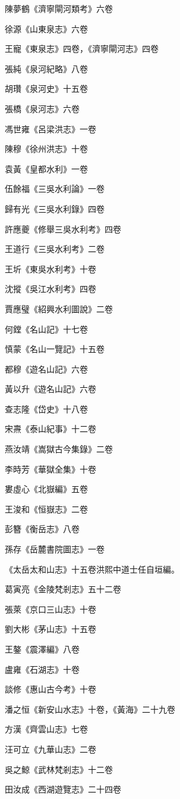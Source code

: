 陳夢鶴《濟寧閘河類考》六卷

徐源《山東泉志》六卷

王寵《東泉志》四卷，《濟寧閘河志》四卷

張純《泉河紀略》八卷

胡瓚《泉河史》十五卷

張橋《泉河志》六卷

馮世雍《呂梁洪志》一卷

陳穆《徐州洪志》十卷

袁黃《皇都水利》一卷

伍餘福《三吳水利論》一卷

歸有光《三吳水利錄》四卷

許應夔《修舉三吳水利考》四卷

王道行《三吳水利考》二卷

王圻《東吳水利考》十卷

沈摐《吳江水利考》四卷

賈應璧《紹興水利圖說》二卷

何鏜《名山記》十七卷

慎蒙《名山一覽記》十五卷

都穆《遊名山記》六卷

黃以升《遊名山記》六卷

查志隆《岱史》十八卷

宋燾《泰山紀事》十二卷

燕汝靖《嵩獄古今集錄》二卷

李時芳《華獄全集》十卷

婁虛心《北嶽編》五卷

王浚和《恒嶽志》二卷

彭簪《衡岳志》八卷

孫存《岳麓書院圖志》一卷

《太岳太和山志》十五卷洪熙中道士任自垣編。

葛寅亮《金陵梵剎志》五十二卷

張萊《京口三山志》十卷

劉大彬《茅山志》十五卷

王鏊《震澤編》八卷

盧雍《石湖志》十卷

談修《惠山古今考》十卷

潘之恒《新安山水志》十卷，《黃海》二十九卷

方漢《齊雲山志》七卷

汪可立《九華山志》二卷

吳之鯨《武林梵剎志》十二卷

田汝成《西湖遊覽志》二十四卷

